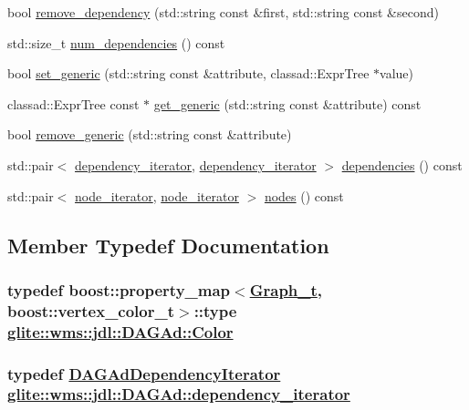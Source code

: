 \begin{CompactItemize}
\item 
bool \hyperlink{classglite_1_1wms_1_1jdl_1_1DAGAd_a15}{remove\_\-dependency} (std::string const \&first, std::string const \&second)
\item 
std::size\_\-t \hyperlink{classglite_1_1wms_1_1jdl_1_1DAGAd_a16}{num\_\-dependencies} () const 
\item 
bool \hyperlink{classglite_1_1wms_1_1jdl_1_1DAGAd_a17}{set\_\-generic} (std::string const \&attribute, classad::Expr\-Tree $\ast$value)
\item 
classad::Expr\-Tree const $\ast$ \hyperlink{classglite_1_1wms_1_1jdl_1_1DAGAd_a18}{get\_\-generic} (std::string const \&attribute) const 
\item 
bool \hyperlink{classglite_1_1wms_1_1jdl_1_1DAGAd_a19}{remove\_\-generic} (std::string const \&attribute)
\item 
std::pair$<$ \hyperlink{structglite_1_1wms_1_1jdl_1_1DAGAdDependencyIterator}{dependency\_\-iterator}, \hyperlink{structglite_1_1wms_1_1jdl_1_1DAGAdDependencyIterator}{dependency\_\-iterator} $>$ \hyperlink{classglite_1_1wms_1_1jdl_1_1DAGAd_a20}{dependencies} () const 
\item 
std::pair$<$ \hyperlink{classglite_1_1wms_1_1jdl_1_1DAGAdNodeIterator}{node\_\-iterator}, \hyperlink{classglite_1_1wms_1_1jdl_1_1DAGAdNodeIterator}{node\_\-iterator} $>$ \hyperlink{classglite_1_1wms_1_1jdl_1_1DAGAd_a21}{nodes} () const 
\end{CompactItemize}


\subsection{Member Typedef Documentation}
\hypertarget{classglite_1_1wms_1_1jdl_1_1DAGAd_w6}{
\subsubsection[Color]{\setlength{\rightskip}{0pt plus 5cm}typedef boost::property\_\-map$<$\hyperlink{classglite_1_1wms_1_1jdl_1_1DAGAd_w4}{Graph\_\-t}, boost::vertex\_\-color\_\-t$>$::type \hyperlink{classglite_1_1wms_1_1jdl_1_1DAGAd_w6}{glite::wms::jdl::DAGAd::Color}}}
\label{classglite_1_1wms_1_1jdl_1_1DAGAd_w6}


\hypertarget{classglite_1_1wms_1_1jdl_1_1DAGAd_w2}{
\subsubsection[dependency\_\-iterator]{\setlength{\rightskip}{0pt plus 5cm}typedef \hyperlink{structglite_1_1wms_1_1jdl_1_1DAGAdDependencyIterator}{DAGAd\-Dependency\-Iterator} \hyperlink{structglite_1_1wms_1_1jdl_1_1DAGAdDependencyIterator}{glite::wms::jdl::DAGAd::dependency\_\-iterator}}}
\label{classglite_1_1wms_1_1jdl_1_1DAGAd_w2}


